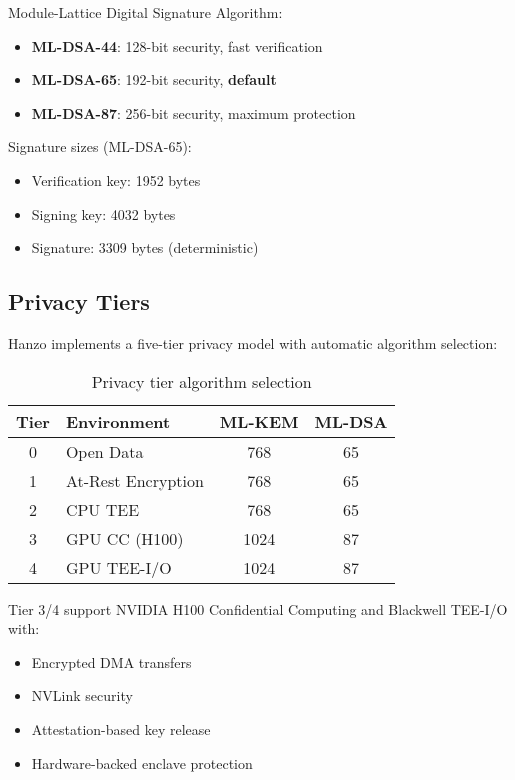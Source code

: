 \documentclass[11pt,twocolumn]{article}
\begin{document}
Module-Lattice Digital Signature Algorithm:

\begin{itemize}
\item \textbf{ML-DSA-44}: 128-bit security, fast verification
\item \textbf{ML-DSA-65}: 192-bit security, \textbf{default}
\item \textbf{ML-DSA-87}: 256-bit security, maximum protection
\end{itemize}

Signature sizes (ML-DSA-65):
\begin{itemize}
\item Verification key: 1952 bytes
\item Signing key: 4032 bytes
\item Signature: 3309 bytes (deterministic)
\end{itemize}

\subsection{Privacy Tiers}

Hanzo implements a five-tier privacy model with automatic algorithm selection:

\begin{table}[h]
\centering
\small
\begin{tabular}{|c|l|c|c|}
\hline
\textbf{Tier} & \textbf{Environment} & \textbf{ML-KEM} & \textbf{ML-DSA} \\
\hline
0 & Open Data & 768 & 65 \\
1 & At-Rest Encryption & 768 & 65 \\
2 & CPU TEE & 768 & 65 \\
3 & GPU CC (H100) & 1024 & 87 \\
4 & GPU TEE-I/O & 1024 & 87 \\
\hline
\end{tabular}
\caption{Privacy tier algorithm selection}
\label{tab:privacy_tiers}
\end{table}

Tier 3/4 support NVIDIA H100 Confidential Computing and Blackwell TEE-I/O with:
\begin{itemize}
\item Encrypted DMA transfers
\item NVLink security
\item Attestation-based key release
\item Hardware-backed enclave protection
\end{itemize}
\end{document}
